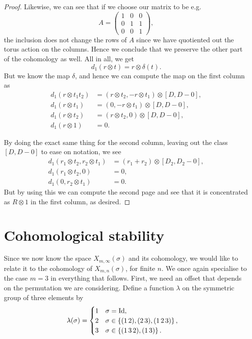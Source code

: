 \begin{proof}
  Likewise, we can see that if we choose our matrix to be e.g.
  \[ A = \begin{pmatrix}
    1 & 0 & 0 \\
    0 & 1 & 1 \\
    0 & 0 & 1
  \end{pmatrix}, \]
  the inclusion does not change the rows of $A$ since we have
  quotiented out the torus action on the columns. Hence we conclude
  that we preserve the other part of the cohomology as well. All in
  all, we get
  \[ d_1(r\otimes t) = r \otimes \delta(t). \]
  But we know the map $\delta$, and hence we can compute the map on
  the first
  column as
  \begin{align*}
    d_1(r \otimes t_1t_2) &= ( r\otimes t_2, - r\otimes t_1) \otimes
    [D,D-0], \\
    d_1(r \otimes t_1) &= (0, -r\otimes t_1) \otimes [D,D-0], \\
    d_1(r \otimes t_2) &= (r\otimes t_2,0) \otimes [D,D-0], \\
    d_1(r \otimes 1) &= 0.
  \end{align*}

  By doing the exact same thing for the second column, leaving out
  the class $[D,D-0]$ to ease on notation, we see
  \begin{align*}
    d_1( r_1\otimes t_2, r_2\otimes t_1) &= (r_1 + r_2) \otimes
                                           [D_2,D_2-0], \\
    d_1( r_1 \otimes t_2, 0) &= 0, \\
    d_1( 0, r_2\otimes t_1) &= 0.
  \end{align*} 
  But by using this we can compute the second page and see that it is
  concentrated as $R\otimes 1$ in the first column, as desired.
\end{proof}


\section{Cohomological stability}
\label{sec:costa}

Since we now know the space $X_{m,\infty}(\sigma)$ and its cohomology, we
would like to relate it to the cohomology of
$X_{m,n}(\sigma)$, for finite $n$. We once again specialise to the
case $m = 3$ in
everything that
follows. First, we need an offset that depends on the permutation
we are considering.
Define a function $\lambda$ on the symmetric group of three elements
by
\begin{align*}
  \lambda(\sigma) &=
                    \begin{cases}
                      1 & \sigma = \operatorname{Id}, \\
                      2 & \sigma \in \left\{ (1\,2),(2\,3),(1\,2\,3) \right\},
                      \\
                      3 & \sigma \in \left\{ (1\,3\,2), (1\,3) \right\}.
                    \end{cases}
\end{align*}

